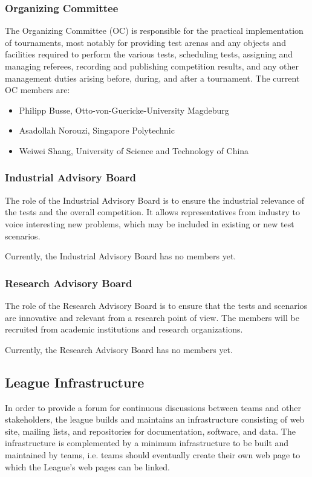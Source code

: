 \subsubsection{Organizing Committee}
The Organizing Committee (OC) is responsible for the practical implementation of tournaments, most notably for providing test arenas and any objects and facilities required to perform the various tests, scheduling tests, assigning and managing referees, recording and publishing competition results, and any other management duties arising before, during, and after a tournament. The current OC members are:

\begin{itemize}
	\item Philipp Busse, Otto-von-Guericke-University Magdeburg
	\item Asadollah Norouzi, Singapore Polytechnic
	\item Weiwei Shang, University of Science and Technology of China
\end{itemize}

\subsubsection{Industrial Advisory Board}

The role of the Industrial Advisory Board is to ensure the industrial relevance of the tests and the overall competition. It allows representatives from industry to voice interesting new problems, which may be included in existing or new test scenarios. 
\par
Currently, the Industrial Advisory Board has no members yet.

\subsubsection{ Research Advisory Board}

The role of the Research Advisory Board is to ensure that the tests and scenarios are innovative and relevant from a research point of view. The members will be recruited from academic institutions and research organizations.
\par
Currently, the Research Advisory Board has no members yet.

\subsection{League Infrastructure}
In order to provide a forum for continuous discussions between teams and other stakeholders, the league builds and maintains an infrastructure consisting of web site, mailing lists, and repositories for documentation, software, and data. The infrastructure is complemented by a minimum infrastructure to be built and maintained by teams, i.e. teams should eventually create their own web page to which the \RCAW League’s web pages can be linked.

